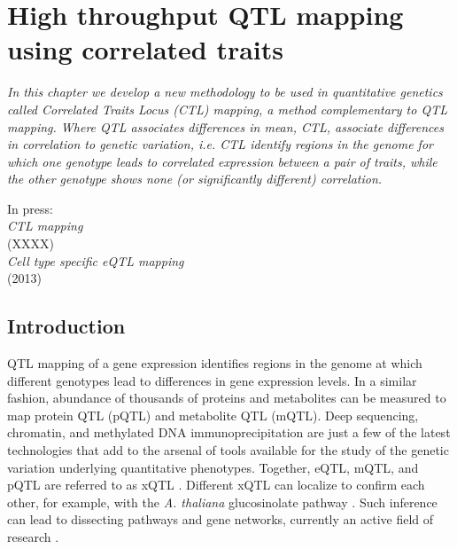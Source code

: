 \chapter{High throughput QTL mapping using correlated traits}
\thispagestyle{empty}
\label{chap:ctlmapping}

\emph{In this chapter we develop a new methodology to be used in quantitative genetics 
called Correlated Traits Locus (CTL) mapping, a method complementary to QTL mapping. 
Where QTL associates differences in mean, CTL, associate differences in correlation to 
genetic variation, i.e. CTL identify regions in the genome for which one genotype leads 
to correlated expression between a pair of traits, while the other genotype shows none 
(or significantly different) correlation.}

\null
\vfill

\begin{myexampleblock}{In press:}
  \\
  \emph{CTL mapping}\\
   (XXXX)
  \\
  \emph{Cell type specific eQTL mapping}\\
   (2013)
\end{myexampleblock}

\newpage

\section{Introduction}
  QTL mapping of a gene expression identifies regions in the genome at which different genotypes lead to differences in gene
  expression levels. In a similar fashion, abundance of thousands of proteins and metabolites can be measured to map protein 
  QTL (pQTL) and metabolite QTL (mQTL). 
  Deep sequencing, chromatin, and methylated DNA immunoprecipitation are just a few of the latest technologies that add to 
  the arsenal of tools available for the study of the genetic variation underlying quantitative phenotypes. Together, eQTL, 
  mQTL, and pQTL are referred to as xQTL \cite{Arends:2012}. Different xQTL can localize to confirm each other, for example, 
  with the \emph{A. thaliana} glucosinolate pathway \cite{Jansen:2009}. Such inference can lead to dissecting pathways and gene networks, 
  currently an active field of research \cite{Prins:2012}.
  
